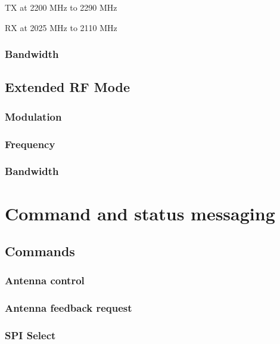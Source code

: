\documentclass[english,title,a4paper]{report}
\begin{document}
TX at 2200 MHz to 2290 MHz

RX at 2025 MHz to 2110 MHz

\subsection{Bandwidth}\label{bandwidth}

\section{Extended RF Mode}\label{extended-rf-mode}

\subsection{Modulation}\label{modulation-1}

\subsection{Frequency}\label{frequency-1}

\subsection{Bandwidth}\label{bandwidth-1}

\chapter{Command and status messaging}\label{command-and-status-messaging}

\section{Commands}\label{commands}

\subsection{Antenna control}\label{antenna-control}

\subsection{Antenna feedback request}\label{antenna-feedback-request}

\subsection{SPI Select}\label{spi-select}
\end{document}
